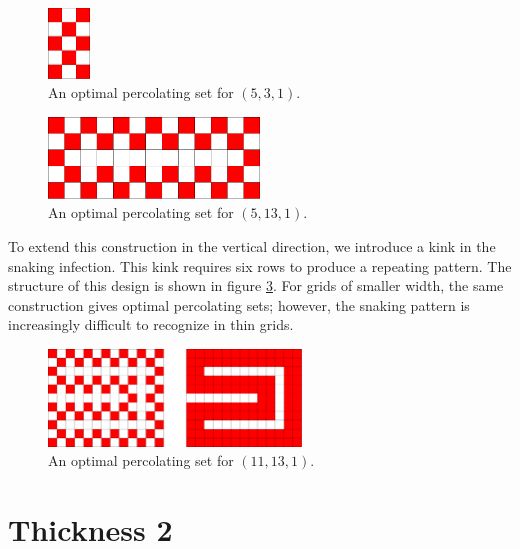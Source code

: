 \begin{figure}[]
\centering
\includegraphics[width=0.1\textwidth]{figures/4/5x3x1.pdf}
\caption{An optimal percolating set for $(5,3,1)$.}
\label{fig:5x3x1}
\end{figure} 

\begin{figure}[]
\centering
\includegraphics[width=0.5\textwidth]{figures/4/5x13x1.pdf}
\caption{An optimal percolating set for $(5,13,1)$.}
\label{fig:5x13x1}
\end{figure} 

To extend this construction in the vertical direction, we introduce a kink in the snaking infection. This kink requires six rows to produce a repeating pattern. The structure of this design is shown in figure \ref{fig:11x13x1}. For grids of smaller width, the same construction gives optimal percolating sets; however, the snaking pattern is increasingly difficult to recognize in thin grids.

\begin{figure}[]
\centering
\includegraphics[width=0.6\textwidth]{figures/4/11x13x1.pdf}
\caption{An optimal percolating set for $(11,13,1)$.}
\label{fig:11x13x1}
\end{figure} 


\section{Thickness 2}



